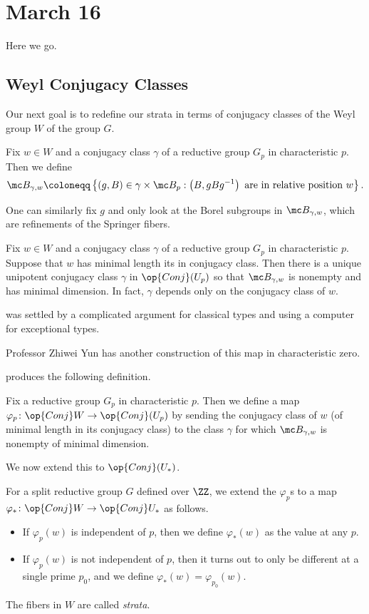 \documentclass[../notes.tex]{subfiles}
\begin{document}
\section{March 16}
Here we go.

\subsection{Weyl Conjugacy Classes}
Our next goal is to redefine our strata in terms of conjugacy classes of the Weyl group $W$ of the group $G$.
\begin{definition}
	Fix $w\in W$ and a conjugacy class $\gamma$ of a reductive group $G_p$ in characteristic $p$. Then we define
	\[\mc B_{\gamma,w}\coloneqq\left\{(g,B)\in\gamma\times\mc B_p:\left(B,gBg^{-1}\right)\text{ are in relative position }w\right\}.\]
\end{definition}
\begin{remark}
	One can similarly fix $g$ and only look at the Borel subgroups in $\mc B_{\gamma,w}$, which are refinements of the Springer fibers.
\end{remark}
\begin{theorem}[Lusztig~2011] \label{thm:weyl-to-unip}
	Fix $w\in W$ and a conjugacy class $\gamma$ of a reductive group $G_p$ in characteristic $p$. Suppose that $w$ has minimal length its in conjugacy class. Then there is a unique unipotent conjugacy class $\gamma$ in $\op{Conj}(U_p)$ so that $\mc B_{\gamma,w}$ is nonempty and has minimal dimension. In fact, $\gamma$ depends only on the conjugacy class of $w$.
\end{theorem}
 was settled by a complicated argument for classical types and using a computer for exceptional types.
\begin{remark}
	Professor Zhiwei Yun has another construction of this map in characteristic zero.
\end{remark}
 produces the following definition.
\begin{definition}
	Fix a reductive group $G_p$ in characteristic $p$. Then we define a map $\varphi_p\colon\op{Conj}W\to\op{Conj}(U_p)$ by sending the conjugacy class of $w$ (of minimal length in its conjugacy class) to the class $\gamma$ for which $\mc B_{\gamma,w}$ is nonempty of minimal dimension.
\end{definition}
We now extend this to $\op{Conj}(U_*)$.
\begin{definition}
	For a split reductive group $G$ defined over $\ZZ$, we extend the $\varphi_p$s to a map $\varphi_*\colon\op{Conj}W\to\op{Conj}U_*$ as follows.
	\begin{itemize}
		\item If $\varphi_p(w)$ is independent of $p$, then we define $\varphi_*(w)$ as the value at any $p$.
		\item If $\varphi_p(w)$ is not independent of $p$, then it turns out to only be different at a single prime $p_0$, and we define $\varphi_*(w)=\varphi_{p_0}(w)$.
	\end{itemize}
	The fibers in $W$ are called \textit{strata}.
\end{definition}
\end{document}
